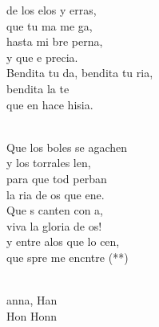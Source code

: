 \begin{cancion}%
	 de los elos y erras, \\
	 que tu ma me ga,\\
	hasta mi bre perna, \\
	y que e  precia.\\
	Bendita tu da, bendita tu ria,\\
	bendita la te\\
	que en  hace hisia.\\\jump\\
	\begin{chorus}%
	Que los boles se agachen \\
	y los torrales len,\\
	para que tod perban \\
	la ria de os que ene.\\
	Que s canten con a, \\
	viva la gloria de os!\\
	y entre alos que lo cen, \\
	que spre me encntre (**)\\
	\end{chorus}%
	\jump\\
	anna, Han\\
	Hon Honn\\
\end{cancion}%
